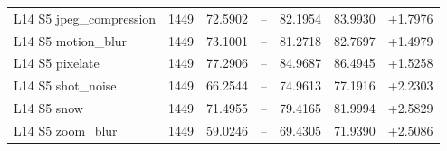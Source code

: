 \begin{table}[htbp]
\begin{tabular}{lrrrrrr}
L14 S5 jpeg\_compression & 1449 & 72.5902 & -- & 82.1954 & 83.9930 & +1.7976 \\
L14 S5 motion\_blur & 1449 & 73.1001 & -- & 81.2718 & 82.7697 & +1.4979 \\
L14 S5 pixelate & 1449 & 77.2906 & -- & 84.9687 & 86.4945 & +1.5258 \\
L14 S5 shot\_noise & 1449 & 66.2544 & -- & 74.9613 & 77.1916 & +2.2303 \\
L14 S5 snow & 1449 & 71.4955 & -- & 79.4165 & 81.9994 & +2.5829 \\
L14 S5 zoom\_blur & 1449 & 59.0246 & -- & 69.4305 & 71.9390 & +2.5086 \\
\bottomrule
\end{tabular}
\end{table}
